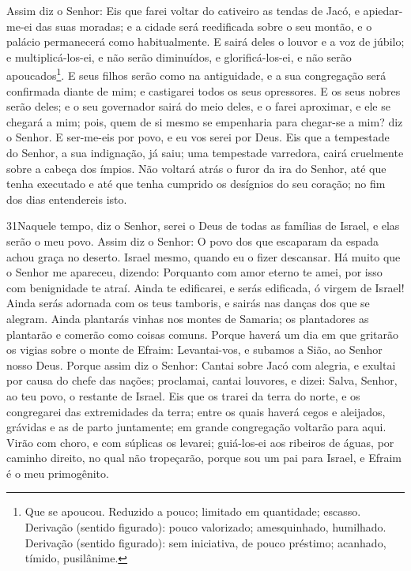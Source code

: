 Assim diz o Senhor: Eis que farei voltar do cativeiro as tendas
de Jacó, e apiedar-me-ei das suas moradas; e a cidade será
reedificada sobre o seu montão, e o palácio permanecerá como
habitualmente. E sairá deles o louvor e a voz de júbilo; e
multiplicá-los-ei, e não serão diminuídos, e glorificá-los-ei, e não
serão apoucados\footnote{Que se apoucou. Reduzido a pouco; limitado
em quantidade; escasso. Derivação (sentido figurado): pouco
valorizado; amesquinhado, humilhado. Derivação (sentido figurado):
sem iniciativa, de pouco préstimo; acanhado, tímido, pusilânime.}.
E seus filhos serão como na antiguidade, e a sua congregação
será confirmada diante de mim; e castigarei todos os seus
opressores. E os seus nobres serão deles; e o seu governador
sairá do meio deles, e o farei aproximar, e ele se chegará a mim;
pois, quem de si mesmo se empenharia para chegar-se a mim? diz o
Senhor. E ser-me-eis por povo, e eu vos serei por Deus.
Eis que a tempestade do Senhor, a sua indignação, já saiu;
uma tempestade varredora, cairá cruelmente sobre a cabeça dos
ímpios. Não voltará atrás o furor da ira do Senhor, até que
tenha executado e até que tenha cumprido os desígnios do seu
coração; no fim dos dias entendereis isto.

\medskip

\lettrine{31} Naquele tempo, diz o Senhor, serei o Deus de
todas as famílias de Israel, e elas serão o meu povo. Assim diz
o Senhor: O povo dos que escaparam da espada achou graça no deserto.
Israel mesmo, quando eu o fizer descansar. Há muito que o Senhor
me apareceu, dizendo: Porquanto com amor eterno te amei, por isso
com benignidade te atraí. Ainda te edificarei, e serás
edificada, ó virgem de Israel! Ainda serás adornada com os teus
tamboris, e sairás nas danças dos que se alegram. Ainda
plantarás vinhas nos montes de Samaria; os plantadores as plantarão
e comerão como coisas comuns. Porque haverá um dia em que
gritarão os vigias sobre o monte de Efraim: Levantai-vos, e subamos
a Sião, ao Senhor nosso Deus. Porque assim diz o Senhor: Cantai
sobre Jacó com alegria, e exultai por causa do chefe das nações;
proclamai, cantai louvores, e dizei: Salva, Senhor, ao teu povo, o
restante de Israel. Eis que os trarei da terra do norte, e os
congregarei das extremidades da terra; entre os quais haverá cegos e
aleijados, grávidas e as de parto juntamente; em grande congregação
voltarão para aqui. Virão com choro, e com súplicas os levarei;
guiá-los-ei aos ribeiros de águas, por caminho direito, no qual não
tropeçarão, porque sou um pai para Israel, e Efraim é o meu
primogênito.

